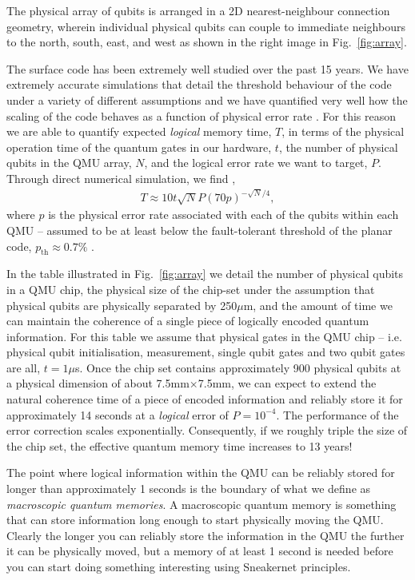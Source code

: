 \documentclass[twocolumn, aps, rmp, amsmath, amssymb, nofootinbib, superscriptaddress, longbibliography, floatfix, table-of-contents, eqsecnum]{revtex4-2}
\begin{document}
The physical array of qubits is arranged in a 2D nearest-neighbour connection geometry, wherein individual physical qubits can couple to immediate neighbours to the north, south, east, and west as shown in the right image in Fig.~\ref{fig:array}. 

The surface code has been extremely well studied over the past 15 years. We have extremely accurate simulations that detail the threshold behaviour of the code under a variety of different assumptions and we have quantified very well how the scaling of the code behaves as a function of physical error rate \cite{SD-Stace:2010aa,SD-Wang:2011aa,SD-Stephens:2014aa,SD-Nagayama:2017aa,SD-Tuckett:2018aa}. For this reason we are able to quantify expected \textit{logical} memory time, $T$, in terms of the physical operation time of the quantum gates in our hardware, $t$, the number of physical qubits in the QMU array, $N$, and the logical error rate we want to target, $P$. Through direct numerical simulation, we find \cite{SD-Devitt:2016aa},
\begin{align} \label{eq:scale}
T \approx 10t\sqrt{N} P(70p)^{-\sqrt{N}/4},
\end{align}
where $p$ is the physical error rate associated with each of the qubits within each QMU -- assumed to be at least below the fault-tolerant threshold of the planar code, $p_\mathrm{th} \approx 0.7\%$ \cite{SD-Fowler:2012aa}.

In the table illustrated in Fig.~\ref{fig:array} we detail the number of physical qubits in a QMU chip, the physical size of the chip-set under the assumption that physical qubits are physically separated by 250$\mu$m, and the amount of time we can maintain the coherence of a single piece of logically encoded quantum information. For this table we assume that physical gates in the QMU chip -- i.e. physical qubit initialisation, measurement, single qubit gates and two qubit gates are all, $t = 1\mu$s. Once the chip set contains approximately 900 physical qubits at a physical dimension of about 7.5mm$\times$7.5mm, we can expect to extend the natural coherence time of a piece of encoded information and reliably store it for approximately 14 seconds at a \textit{logical} error of $P= 10^{-4}$. The performance of the error correction scales exponentially. Consequently, if we roughly triple the size of the chip set, the effective quantum memory time increases to 13 years!

The point where logical information within the QMU can be reliably stored for longer than approximately 1 seconds is the boundary of what we define as \textit{macroscopic quantum memories}. A macroscopic quantum memory is something that can store information long enough to start physically moving the QMU. Clearly the longer you can reliably store the information in the QMU the further it can be physically moved, but a memory of at least 1 second is needed before you can start doing something interesting using Sneakernet principles.
\end{document}

